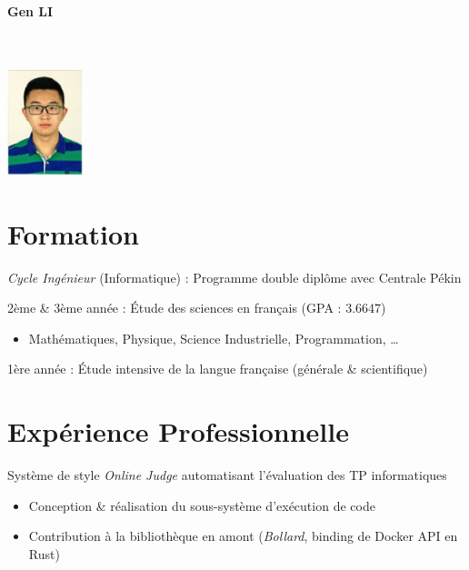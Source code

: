 \documentclass{resume}
\begin{document}

\noindent\begin{minipage}{0.3\textwidth}
  \Large{
    \textbf{Gen LI}\\
       \\
     \\
  }
\end{minipage}
\hfill%
\begin{minipage}{0.6\textwidth}\raggedleft
  \includegraphics[width=0.88in]{avatar}
\end{minipage}

\section{Formation}
\textit{Cycle Ingénieur} (Informatique) : Programme double diplôme avec Centrale Pékin

2ème \& 3ème année : Étude des sciences en français (GPA : 3.6647)
\begin{itemize}
  \item Mathématiques, Physique, Science Industrielle, Programmation, …
\end{itemize}
1ère année : Étude intensive de la langue française (générale \& scientifique)


\section{Expérience Professionnelle}
Système de style \textit{Online Judge} automatisant l'évaluation des TP informatiques
\begin{itemize}
  \item Conception \& réalisation du sous-système d'exécution de code
  \item Contribution à la bibliothèque en amont (\textit{Bollard}, binding de Docker API en Rust)
\end{itemize}
\end{document}
